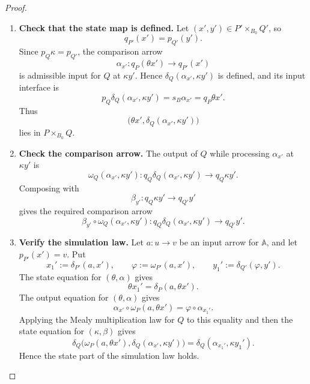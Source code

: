 \begin{proof}
    \leavevmode
    \begin{enumerate}
        \item \textbf{Check that the state map is defined.} Let \((x',y')\in P'\times_{B_0}Q'\), so
        \[
            q_{P'}(x')=p_{Q'}(y').
        \]
        Since \(p_Q\kappa=p_{Q'}\), the comparison arrow
        \[
            \alpha_{x'}:q_P(\theta x')\to q_{P'}(x')
        \]
        is admissible input for \(Q\) at \(\kappa y'\). Hence \(\delta_Q(\alpha_{x'},\kappa y')\) is defined, and its input interface is
        \[
            p_Q\delta_Q(\alpha_{x'},\kappa y')
            =s_B\alpha_{x'}
            =q_P\theta x'.
        \]
        Thus
        \[
            \bigl(\theta x',\delta_Q(\alpha_{x'},\kappa y')\bigr)
        \]
        lies in \(P\times_{B_0}Q\).

        \item \textbf{Check the comparison arrow.} The output of \(Q\) while processing \(\alpha_{x'}\) at \(\kappa y'\) is
        \[
            \omega_Q(\alpha_{x'},\kappa y'):
            q_Q\delta_Q(\alpha_{x'},\kappa y')
            \to
            q_Q\kappa y'.
        \]
        Composing with
        \[
            \beta_{y'}:q_Q\kappa y'\to q_{Q'}y'
        \]
        gives the required comparison arrow
        \[
            \beta_{y'}\circ\omega_Q(\alpha_{x'},\kappa y'):
            q_Q\delta_Q(\alpha_{x'},\kappa y')
            \to
            q_{Q'}y'.
        \]

        \item \textbf{Verify the simulation law.} Let \(a:u\to v\) be an input arrow for \(\mathbb A\), and let \(p_{P'}(x')=v\). Put
        \[
            x_1':=\delta_{P'}(a,x'),
            \qquad
            \varphi:=\omega_{P'}(a,x'),
            \qquad
            y_1':=\delta_{Q'}(\varphi,y').
        \]
        The state equation for \((\theta,\alpha)\) gives
        \[
            \theta x_1'=\delta_P(a,\theta x').
        \]
        The output equation for \((\theta,\alpha)\) gives
        \[
            \alpha_{x'}\circ\omega_P(a,\theta x')
            =
            \varphi\circ\alpha_{x_1'}.
        \]
        Applying the Mealy multiplication law for \(Q\) to this equality and then the state equation for \((\kappa,\beta)\) gives
        \[
            \delta_Q\bigl(
                \omega_P(a,\theta x'),
                \delta_Q(\alpha_{x'},\kappa y')
            \bigr)
            =
            \delta_Q(\alpha_{x_1'},\kappa y_1').
        \]
        Hence the state part of the simulation law holds.


\end{enumerate}
\end{proof}
